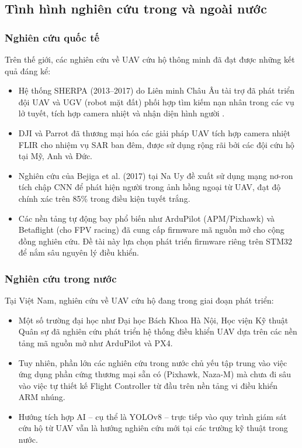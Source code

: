 \subsection{Tình hình nghiên cứu trong và ngoài nước}

\subsubsection{Nghiên cứu quốc tế}

Trên thế giới, các nghiên cứu về UAV cứu hộ thông minh đã đạt được những kết quả đáng kể:

\begin{itemize}
    \item Hệ thống SHERPA (2013--2017) do Liên minh Châu Âu tài trợ đã phát triển đội UAV và UGV (robot mặt đất) phối hợp tìm kiếm nạn nhân trong các vụ lở tuyết, tích hợp camera nhiệt và nhận diện hình người \cite{DellAmore2014}.
    \item DJI và Parrot đã thương mại hóa các giải pháp UAV tích hợp camera nhiệt FLIR cho nhiệm vụ SAR ban đêm, được sử dụng rộng rãi bởi các đội cứu hộ tại Mỹ, Anh và Đức.
    \item Nghiên cứu của Bejiga et al. (2017) tại Na Uy đề xuất sử dụng mạng nơ-ron tích chập CNN để phát hiện người trong ảnh hồng ngoại từ UAV, đạt độ chính xác trên 85\% trong điều kiện tuyết trắng.
    \item Các nền tảng tự động bay phổ biến như ArduPilot (APM/Pixhawk) và Betaflight (cho FPV racing) đã cung cấp firmware mã nguồn mở cho cộng đồng nghiên cứu. Đề tài này lựa chọn phát triển firmware riêng trên STM32 để nắm sâu nguyên lý điều khiển.
\end{itemize}

\subsubsection{Nghiên cứu trong nước}

Tại Việt Nam, nghiên cứu về UAV cứu hộ đang trong giai đoạn phát triển:

\begin{itemize}
    \item Một số trường đại học như Đại học Bách Khoa Hà Nội, Học viện Kỹ thuật Quân sự đã nghiên cứu phát triển hệ thống điều khiển UAV dựa trên các nền tảng mã nguồn mở như ArduPilot và PX4.
    \item Tuy nhiên, phần lớn các nghiên cứu trong nước chủ yếu tập trung vào việc ứng dụng phần cứng thương mại sẵn có (Pixhawk, Naza-M) mà chưa đi sâu vào việc tự thiết kế Flight Controller từ đầu trên nền tảng vi điều khiển ARM nhúng.
    \item Hướng tích hợp AI -- cụ thể là YOLOv8 -- trực tiếp vào quy trình giám sát cứu hộ từ UAV vẫn là hướng nghiên cứu mới tại các trường kỹ thuật trong nước.
\end{itemize}

